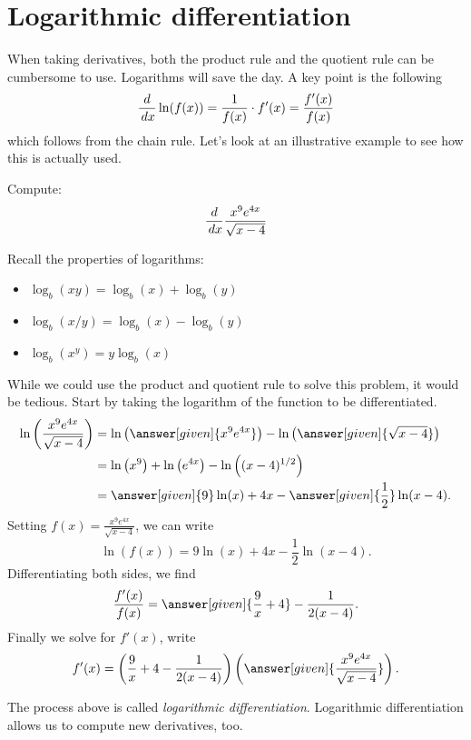 \documentclass{ximera}
\begin{document}
\section{Logarithmic differentiation}


When taking derivatives, both the product rule and the quotient rule
can be cumbersome to use. Logarithms will save the day. A key point is
the following
\[ \frac{d}{\,d x} \ln(f(x)) = \frac{1}{f(x)}\cdot f'(x) = \frac{f'(x)}{f(x)} \]
which follows from the chain rule. Let's look at an illustrative
example to see how this is actually used.

\begin{example} 
	Compute:
	\[
	\frac{d}{\,d x} \frac{x^9e^{4x}}{\sqrt{x-4}}
	\]
	\begin{explanation}
		Recall the properties of logarithms:
		\begin{itemize}
			\item $\log_b(xy) = \log_b(x) + \log_b(y)$
			\item $\log_b(x/y) = \log_b(x) - \log_b(y)$
			\item $\log_b(x^y) = y\log_b(x)$
		\end{itemize}
		
		While we could use the product and quotient rule to solve this
		problem, it would be tedious. Start by taking the logarithm of the
		function to be differentiated.
		\begin{align*}
			\ln\left(\frac{x^9e^{4x}}{\sqrt{x-4}} \right) &= \ln\left(\answer[given]{x^9e^{4x}}\right) - \ln\left(\answer[given]{\sqrt{x-4}}\right)\\
				&= \ln\left(x^9\right)+\ln\left(e^{4x}\right) - \ln\left((x-4)^{1/2}\right)\\
				&= \answer[given]{9}\ln(x)+4x - \answer[given]{\frac{1}{2}}\ln(x-4).
		\end{align*}
		Setting $f(x) = \frac{x^9e^{4x}}{\sqrt{x-4}}$, we can write
		\[ \ln(f(x)) = 9\ln(x)+4x - \frac{1}{2}\ln(x-4).\]
		Differentiating both sides, we find
		\[ \frac{f'(x)}{f(x)} = \answer[given]{\frac{9}{x}+4} - \frac{1}{2(x-4)}.\]
		Finally we solve for $f'(x)$, write
		\[f'(x) = \left(\frac{9}{x}+4 - \frac{1}{2(x-4)}\right)\left(\answer[given]{\frac{x^9e^{4x}}{\sqrt{x-4}}}\right). \]
	\end{explanation}
\end{example}

The process above is called \textit{logarithmic differentiation}. Logarithmic differentiation allows us to compute new derivatives, too.
\end{document}
